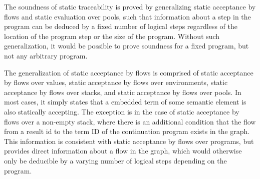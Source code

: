 \documentclass[10pt]{article}
\begin{document}
The soundness of static traceability is proved by generalizing
static acceptance by flows and static evaluation over pools, such that information about a step in
the program can be deduced by a fixed number of logical steps regardless of the location of the
program step or the size of the program. Without such generalization, it would be possible to
prove soundness for a fixed program, but not any arbitrary program.

The generalization of static acceptance by flows is comprised of static acceptance by flows over values,
static acceptance by flows over environments, static acceptance by flows over stacks, and static
acceptance by flows over pools.
In most cases, it simply states that a embedded term of some semantic element is also statically
accepting. The exception is in the case of
static acceptance by flows over a non-empty stack, where
there is an additional condition that the flow
from a result id to the term ID
of the continuation program exists in the graph.
This information is consistent with static
acceptance by flows over programs, but provides direct information about a flow in the
graph, which would otherwise only be deducible by a varying number of logical steps
depending on the program.
\end{document}
